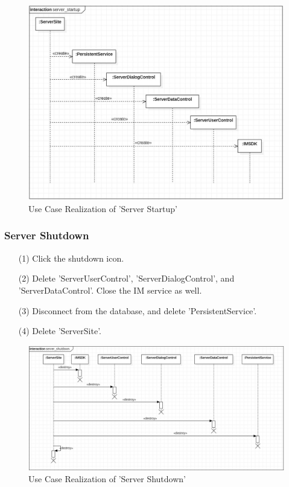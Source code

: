 \documentclass[10pt]{article}
\begin{document}
\begin{figure}[H]
	\centering
	\includegraphics[width=14cm]{1.jpg} 
	\caption{Use Case Realization of 'Server Startup'}
	\label{Use Case Realization of 'Server Startup'}
\end{figure}

\subsubsection{Server Shutdown}

\begin{itemize}
	\item[(1)] Click the shutdown icon.
	\item[(2)] Delete 'ServerUserControl', 'ServerDialogControl', and 'ServerDataControl'. Close the IM service as well.
	\item[(3)] Disconnect from the database, and delete 'PersistentService'.
	\item[(4)] Delete 'ServerSite'.
\end{itemize}

\begin{figure}[H]
	\centering
	\includegraphics[width=14cm]{2.jpg} 
	\caption{Use Case Realization of 'Server Shutdown'}
	\label{Use Case Realization of 'Server Shutdown'}
\end{figure}
\end{document}
